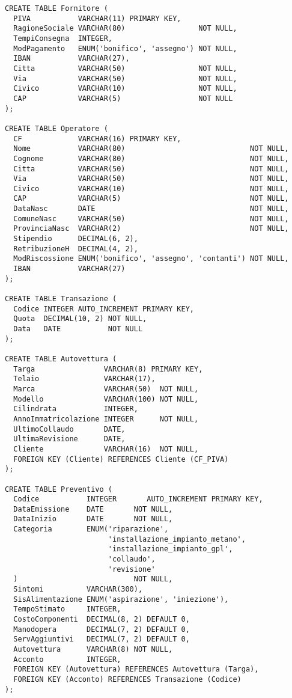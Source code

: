 		\begin{lstlisting}
CREATE TABLE Fornitore (
  PIVA           VARCHAR(11) PRIMARY KEY,
  RagioneSociale VARCHAR(80)                 NOT NULL,
  TempiConsegna  INTEGER,
  ModPagamento   ENUM('bonifico', 'assegno') NOT NULL,
  IBAN           VARCHAR(27),
  Citta          VARCHAR(50)                 NOT NULL,
  Via            VARCHAR(50)                 NOT NULL,
  Civico         VARCHAR(10)                 NOT NULL,
  CAP            VARCHAR(5)                  NOT NULL
);

CREATE TABLE Operatore (
  CF             VARCHAR(16) PRIMARY KEY,
  Nome           VARCHAR(80)                             NOT NULL,
  Cognome        VARCHAR(80)                             NOT NULL,
  Citta          VARCHAR(50)                             NOT NULL,
  Via            VARCHAR(50)                             NOT NULL,
  Civico         VARCHAR(10)                             NOT NULL,
  CAP            VARCHAR(5)                              NOT NULL,
  DataNasc       DATE                                    NOT NULL,
  ComuneNasc     VARCHAR(50)                             NOT NULL,
  ProvinciaNasc  VARCHAR(2)                              NOT NULL,
  Stipendio      DECIMAL(6, 2),
  RetribuzioneH  DECIMAL(4, 2),
  ModRiscossione ENUM('bonifico', 'assegno', 'contanti') NOT NULL,
  IBAN           VARCHAR(27)
);

CREATE TABLE Transazione (
  Codice INTEGER AUTO_INCREMENT PRIMARY KEY,
  Quota  DECIMAL(10, 2) NOT NULL,
  Data   DATE           NOT NULL
);

CREATE TABLE Autovettura (
  Targa                VARCHAR(8) PRIMARY KEY,
  Telaio               VARCHAR(17),
  Marca                VARCHAR(50)  NOT NULL,
  Modello              VARCHAR(100) NOT NULL,
  Cilindrata           INTEGER,
  AnnoImmatricolazione INTEGER      NOT NULL,
  UltimoCollaudo       DATE,
  UltimaRevisione      DATE,
  Cliente              VARCHAR(16)  NOT NULL,
  FOREIGN KEY (Cliente) REFERENCES Cliente (CF_PIVA)
);

CREATE TABLE Preventivo (
  Codice           INTEGER       AUTO_INCREMENT PRIMARY KEY,
  DataEmissione    DATE       NOT NULL,
  DataInizio       DATE       NOT NULL,
  Categoria        ENUM('riparazione',
                        'installazione_impianto_metano',
                        'installazione_impianto_gpl',
                        'collaudo',
                        'revisione'
  )                           NOT NULL,
  Sintomi          VARCHAR(300),
  SisAlimentazione ENUM('aspirazione', 'iniezione'),
  TempoStimato     INTEGER,
  CostoComponenti  DECIMAL(8, 2) DEFAULT 0,
  Manodopera       DECIMAL(7, 2) DEFAULT 0,
  ServAggiuntivi   DECIMAL(7, 2) DEFAULT 0,
  Autovettura      VARCHAR(8) NOT NULL,
  Acconto          INTEGER,
  FOREIGN KEY (Autovettura) REFERENCES Autovettura (Targa),
  FOREIGN KEY (Acconto) REFERENCES Transazione (Codice)
);


\end{lstlisting}
